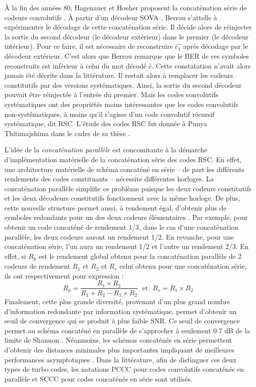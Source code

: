 À la fin des années 80, Hagenauer et Hoeher proposent la concaténation série de codeurs convolutifs \cite{hagenauerConcatenated}.
À partir d'un décodeur SOVA \cite{BerrouHardwareSOVA}, Berrou s’attelle à expérimenter le décodage de cette 
concaténation série. Il décide alors de réinjecter la sortie du second décodeur (le décodeur extérieur) dans le premier
(le décodeur intérieur). Pour ce faire, il est nécessaire de reconstruire $\hat{c_1}$ après décodage par le décodeur extérieur.
C'est alors que Berrou remarque que le BER de ces symboles reconstruits est inférieur à celui du mot décodé $\hat{c}$. 
Cette constatation n'avait alors jamais été décrite dans la littérature. Il restait alors à remplacer les codeurs constitutifs 
par des versions systématiques. Ainsi, la sortie du second décodeur pouvait être réinjectée à l'entrée du premier.
Mais les codes convolutifs systématiques ont des propriétés moins intéressantes que les codes convolutifs non-systématiques, 
à moins qu'il s’agisse d'un code convolutif récursif systématique, dit RSC. L'étude des codes RSC fut donnée à Punya Thitimajshima
dans le cadre de sa thèse \cite{rscTheseTelecom}.

L'idée de la \emph{concaténation parallèle} est concomitante à la démarche d'implémentation matérielle de la 
concaténation série des codes RSC. En effet, une architecture matérielle de schéma concaténé en série -- de part les 
différents rendements des codes constituants -- nécessite différentes horloges. La concaténation parallèle simplifie ce
problème puisque les deux codeurs constitutifs et les deux décodeurs constitutifs fonctionnent avec la même horloge. De plus,
cette nouvelle structure permet aussi, à rendement égal, d'obtenir plus de symboles redondants pour un des deux codeurs 
élémentaires 
. Par exemple, pour obtenir un code concaténé de rendement 1/3, 
dans le cas d'une concaténation parallèle, les deux codeurs auront un rendement 1/2. En revanche, pour une
concaténation série, l'un aura un rendement 1/2 et l'autre un rendement 2/3. En effet, si $R_p$ est le rendement 
global obtenu pour la concaténation parallèle de 2 codeurs de rendement $R_1$ et $R_2$ et $R_s$ celui obtenu pour une 
concaténation série, ils ont respectivement pour expression : 
\[R_p = \frac{R_1 \times R_2}{R_1 + R_2 - R_1 \times R_2} \ \ \ \text{et} \ \ \ R_s = R_1 \times R_2\]
Finalement, cette plus grande diversité, provenant d'un plus grand nombre d'information redondante par information 
systématique, permet d'obtenir un seuil de convergence qui se produit à plus faible SNR. Ce 
seuil de convergence permet au schéma concaténé en parallèle de s'approcher à seulement 0.7 dB de la limite de Shannon 
\cite{berrouTC}. Néanmoins, les schémas concaténés en série permettent d'obtenir des distances minimales plus 
importantes impliquant de meilleures performances asymptotiques \cite{declercq2014channel}. Dans la littérature, afin de distinguer
ces deux types de turbo codes, les notations PCCC pour codes convolutifs concaténés en parallèle et SCCC pour codes
concaténés en série sont utilisés.

